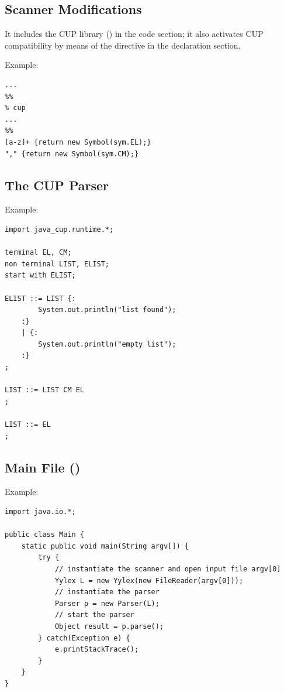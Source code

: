 \subsection{Scanner Modifications}
It includes the CUP library () in the code section; it also activates CUP compatibility by means of the  directive in the declaration section.

Example:
\begin{lstlisting}
...
%%
% cup
...
%%
[a-z]+ {return new Symbol(sym.EL);}
"," {return new Symbol(sym.CM);}
\end{lstlisting}

\subsection{The CUP Parser}
Example:
\begin{lstlisting}
import java_cup.runtime.*;

terminal EL, CM;
non terminal LIST, ELIST;
start with ELIST;

ELIST ::= LIST {:
        System.out.println("list found");
    :}
    | {:
        System.out.println("empty list");
    :}
;

LIST ::= LIST CM EL
;

LIST ::= EL
;
\end{lstlisting}

\subsection{Main File ()}
Example:
\begin{lstlisting}
import java.io.*;

public class Main {
    static public void main(String argv[]) {
        try {
            // instantiate the scanner and open input file argv[0]
            Yylex L = new Yylex(new FileReader(argv[0]));
            // instantiate the parser
            Parser p = new Parser(L);
            // start the parser
            Object result = p.parse();
        } catch(Exception e) {
            e.printStackTrace();
        }
    }
}
\end{lstlisting}

